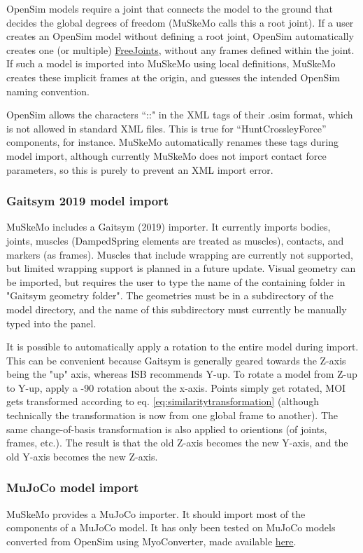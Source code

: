 \documentclass{article}
\begin{document}
OpenSim models require a joint that connects the model to the ground that decides the global degrees of freedom (MuSkeMo calls this a root joint). If a user creates an OpenSim model without defining a root joint, OpenSim automatically creates one (or multiple) \href{https://simtk.org/api_docs/opensim/api_docs/classOpenSim_1_1FreeJoint.html}{FreeJoints}, without any frames defined within the joint. If such a model is imported into MuSkeMo using local definitions, MuSkeMo creates these implicit frames at the origin, and guesses the intended OpenSim naming convention.


OpenSim allows the characters ``::" in the XML tags of their .osim format, which is not allowed in standard XML files. This is true for ``HuntCrossleyForce'' components, for instance. MuSkeMo automatically renames these tags during model import, although currently MuSkeMo does not import contact force parameters, so this is purely to prevent an XML import error.

\subsubsection{Gaitsym 2019 model import}

MuSkeMo includes a Gaitsym (2019) importer. It currently imports bodies, joints, muscles (DampedSpring elements are treated as muscles), contacts, and markers (as frames). Muscles that include wrapping are currently not supported, but limited wrapping support is planned in a future update. Visual geometry can be imported, but requires the user to type the name of the containing folder in "Gaitsym geometry folder". The geometries must be in a subdirectory of the model directory, and the name of this subdirectory must currently be manually typed into the panel.

It is possible to automatically apply a rotation to the entire model during import. This can be convenient because Gaitsym is generally geared towards the Z-axis being the "up" axis, whereas ISB recommends Y-up. To rotate a model from Z-up to Y-up, apply a -90 \degree rotation about the x-axis. Points simply get rotated, MOI gets transformed according to eq. \ref{eq:similaritytransformation} (although technically the transformation is now from one global frame to another). The same change-of-basis transformation is also applied to orientions (of joints, frames, etc.). The result is that the old Z-axis becomes the new Y-axis, and the old Y-axis becomes the new Z-axis.

\subsubsection{MuJoCo model import}
\label{sec:mujocoimporter}
MuSkeMo provides a MuJoCo importer. It should import most of the components of a MuJoCo model. It has only been tested on MuJoCo models converted from OpenSim using MyoConverter, made available \href{https://github.com/MyoHub/myoconverter/tree/main}{here}.
\end{document}
